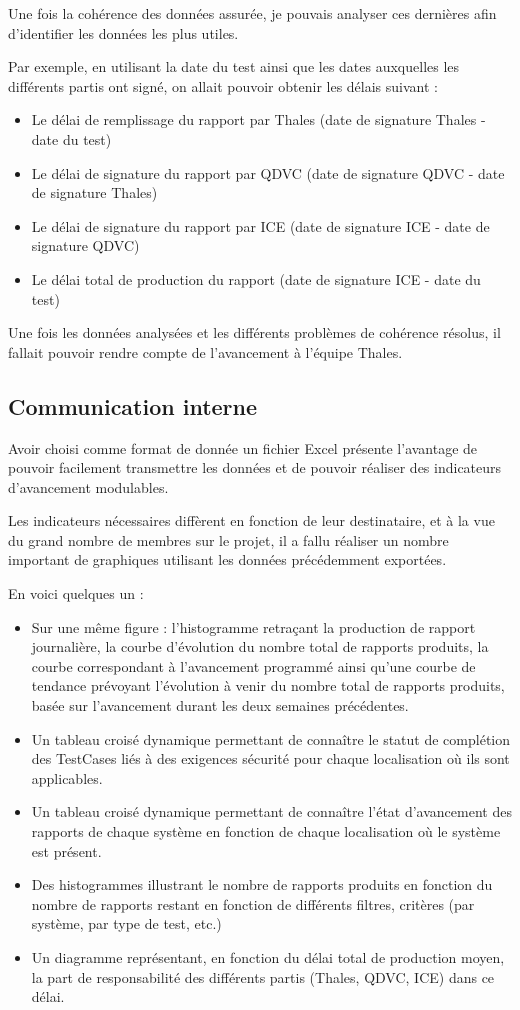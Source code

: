 Une fois la cohérence des données assurée, je pouvais analyser ces dernières afin d'identifier les données les plus utiles.

Par exemple, en utilisant la date du test ainsi que les dates auxquelles les différents partis ont signé, on allait pouvoir obtenir les délais suivant :
\begin{itemize}
\item Le délai de remplissage du rapport par Thales (date de signature Thales - date du test)
\item Le délai de signature du rapport par QDVC (date de signature QDVC - date de signature Thales)
\item Le délai de signature du rapport par ICE (date de signature ICE - date de signature QDVC)
\item Le délai total de production du rapport (date de signature ICE - date du test)
\end{itemize}

Une fois les données analysées et les différents problèmes de cohérence résolus, il fallait pouvoir rendre compte de l'avancement à l'équipe Thales.

\subsection{Communication interne}
Avoir choisi comme format de donnée un fichier Excel présente l'avantage de pouvoir facilement transmettre les données et de pouvoir réaliser des indicateurs d'avancement modulables.

Les indicateurs nécessaires diffèrent en fonction de leur destinataire, et à la vue du grand nombre de membres sur le projet, il a fallu réaliser un nombre important de graphiques utilisant les données précédemment exportées.

En voici quelques un :

\begin{itemize}
\item Sur une même figure : l'histogramme retraçant la production de rapport journalière, la courbe d'évolution du nombre total de rapports produits, la courbe correspondant à l'avancement programmé ainsi qu'une courbe de tendance prévoyant l'évolution à venir du nombre total de rapports produits, basée sur l'avancement durant les deux semaines précédentes.
\item Un tableau croisé dynamique permettant de connaître le statut de complétion des \gls{TestCases} liés à des exigences sécurité pour chaque localisation où ils sont applicables.
\item Un tableau croisé dynamique permettant de connaître l'état d'avancement des rapports de chaque système en fonction de chaque localisation où le système est présent.
\item Des histogrammes illustrant le nombre de rapports produits en fonction du nombre de rapports restant en fonction de différents filtres, critères (par système, par type de test, etc.)
\item Un diagramme représentant, en fonction du délai total de production moyen, la part de responsabilité des différents partis (Thales, QDVC, ICE) dans ce délai.
\end{itemize}


